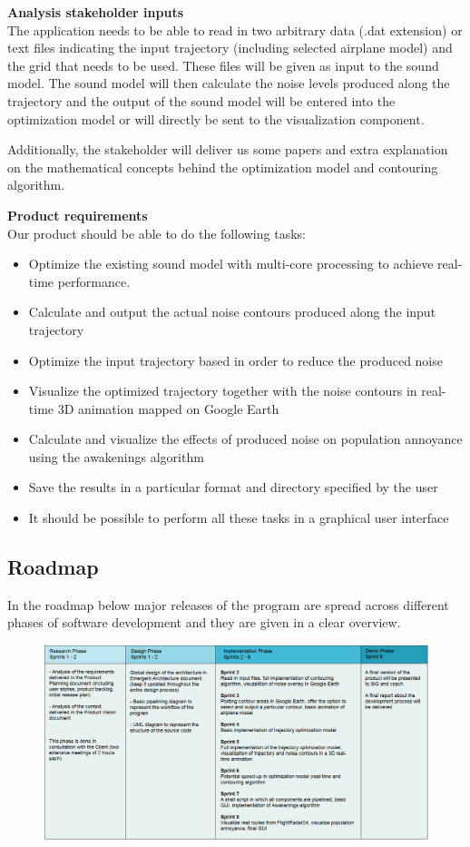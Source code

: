 \textbf{Analysis stakeholder inputs} \\
The application needs to be able to read in two arbitrary data (.dat extension) or text files indicating the input trajectory (including selected airplane model) and the grid that needs to be used. These files will be given as input to the sound model. The sound model will then calculate the noise levels produced along the trajectory and the output of the sound model will be entered into the optimization model or will directly be sent to the visualization component.

Additionally, the stakeholder will deliver us some papers and extra explanation on the mathematical concepts behind the optimization model and contouring algorithm. 

\textbf{Product requirements} \\
Our product should be able to do the following tasks:

\begin{itemize}
\item Optimize the existing sound model with multi-core processing to achieve real-time performance.
\item Calculate and output the actual noise contours produced along the input trajectory
\item Optimize the input trajectory based in order to reduce the produced noise 
\item Visualize the optimized trajectory together with the noise contours in real-time 3D animation mapped on Google Earth
\item Calculate and visualize the effects of produced noise on population annoyance using the awakenings algorithm
\item Save the results in a particular format and directory specified by the user
\item It should be possible to perform all these tasks in a graphical user interface
\end{itemize}

\newpage 

\subsection{Roadmap}
In the roadmap below major releases of the program are spread across different phases of software development and they are given in a clear overview. \\

\begin{figure}[ht]
    \centering
    \includegraphics[width=1.1\textwidth]{images/roadmap}
\end{figure}